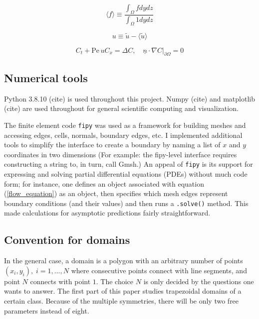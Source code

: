 \documentclass{amsart}
\begin{document}
\begin{equation}
\langle f \rangle \equiv \frac{\int_{\Omega} f dydz}{\int_{\Omega} 1 dydz}
\end{equation}

\begin{equation}
u \equiv \tilde{u} - \langle \tilde{u} \rangle
\end{equation}

\begin{equation}
C_t + \mathrm{Pe} \, u C_x = \Delta C, \quad \left. \underline{n} \cdot \nabla C\right|_{\partial \Omega} = 0 
\end{equation}

\subsection{Numerical tools}
Python 3.8.10 (cite) is used throughout this project. Numpy (cite) and 
matplotlib (cite)  are used throughout for general scientific 
computing and visualization.

The finite element code \texttt{fipy} was used as a framework for 
building meshes and accessing edges, cells, normals, boundary edges, etc. 
I implemented additional tools to simplify the interface to create 
a boundary by naming a list of $x$ and $y$ coordinates in two dimensions 
(For example: the fipy-level interface requires constructing a string to, in turn, call Gmsh.) 
An appeal of \texttt{fipy} is its support for expressing 
and solving partial differential equations (PDEs) without much code
form; for instance, one defines an object associated with 
equation (\ref{flow_equation}) as an object, then specifies which mesh 
edges represent boundary conditions (and their values) and then runs a 
\texttt{.solve()} method. This made calculations for asymptotic 
predictions fairly straightforward.

\subsection{Convention for domains}
In the general case, a domain is a polygon with an arbitrary 
number of points ${(x_i, y_i), \; i=1,\ldots,N }$ where 
consecutive points connect with line segments, and point $N$ connects 
with point $1$. The choice $N$ is only decided by the questions 
one wants to answer. The first part of this paper studies trapezoidal 
domains of a certain class. Because of the multiple symmetries, 
there will be only two free parameters instead of eight.
\end{document}
